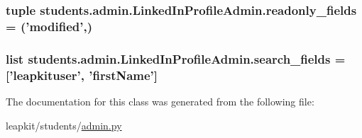 \hypertarget{classstudents_1_1admin_1_1_linked_in_profile_admin_abd0c2a04fc225eba9b673e20ff8e3f23}{
\subsubsection[{readonly\-\_\-fields}]{\setlength{\rightskip}{0pt plus 5cm}tuple students.\-admin.\-Linked\-In\-Profile\-Admin.\-readonly\-\_\-fields = ('modified',)\hspace{0.3cm}{\ttfamily [static]}}}\label{classstudents_1_1admin_1_1_linked_in_profile_admin_abd0c2a04fc225eba9b673e20ff8e3f23}
\hypertarget{classstudents_1_1admin_1_1_linked_in_profile_admin_a6d9b8f11fae479f690c2db995e7a0bb5}{
\subsubsection[{search\-\_\-fields}]{\setlength{\rightskip}{0pt plus 5cm}list students.\-admin.\-Linked\-In\-Profile\-Admin.\-search\-\_\-fields = \mbox{[}'leapkituser', 'first\-Name'\mbox{]}\hspace{0.3cm}{\ttfamily [static]}}}\label{classstudents_1_1admin_1_1_linked_in_profile_admin_a6d9b8f11fae479f690c2db995e7a0bb5}


The documentation for this class was generated from the following file\-:\begin{DoxyCompactItemize}
\item 
leapkit/students/\hyperlink{admin_8py}{admin.\-py}\end{DoxyCompactItemize}
